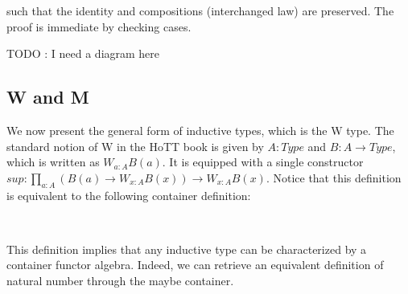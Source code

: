 {\begin{code}
%
\>[2]\AgdaSpace{}%
\AgdaSpace{}%
\AgdaSymbol{(}\AgdaSpace{}%
\AgdaOperator{\AgdaInductiveConstructor{,}}\AgdaSpace{}%
\AgdaSymbol{)}\AgdaSpace{}%
\AgdaSymbol{(}\AgdaSpace{}%
\AgdaOperator{\AgdaInductiveConstructor{,}}\AgdaSpace{}%
\AgdaSymbol{)}\AgdaSpace{}%
\AgdaSpace{}%
\AgdaSpace{}%
\AgdaSpace{}%
\AgdaSpace{}%
\AgdaOperator{\AgdaInductiveConstructor{,}}\AgdaSpace{}%
\AgdaSpace{}%
\AgdaSymbol{(}\AgdaSpace{}%
\AgdaSymbol{(}\AgdaSpace{}%
\AgdaSpace{}%
\AgdaSymbol{))}\AgdaSpace{}%
\AgdaSpace{}%
\AgdaSymbol{\}}\<%
\end{code}

such that the identity and compositions (interchanged law) are preserved. The proof is immediate by checking cases.

TODO : I need a diagram here

\subsection{W and M}

We now present the general form of inductive types, which is the W type. The standard notion of W in the HoTT book is given by $A : Type$ and $B : A \to Type$, which is written as $W_{a : A} B (a)$. It is equipped with a single constructor $sup : \prod_{a : A} (B (a) \to W_{x : A} B (x)) \to W_{x : A} B (x)$. Notice that this definition is equivalent to the following container definition:

\begin{code}%
\>[0]\AgdaSpace{}%
\AgdaSpace{}%
\AgdaSymbol{(}\AgdaSpace{}%
\AgdaSymbol{:}\AgdaSpace{}%
\AgdaSymbol{)}\AgdaSpace{}%
\AgdaSymbol{:}\AgdaSpace{}%
\AgdaSpace{}%
\<%
\\
\>[0][@{}l@{\AgdaIndent{0}}]%
\>[2]\AgdaSpace{}%
\AgdaSymbol{:}\AgdaSpace{}%
\AgdaSpace{}%
\AgdaSpace{}%
\AgdaSpace{}%
\AgdaSymbol{(}\AgdaSpace{}%
\AgdaSymbol{)}\AgdaSpace{}%
\AgdaSpace{}%
\AgdaSpace{}%
\<%
\end{code}

This definition implies that any inductive type can be characterized by a container functor algebra. Indeed, we can retrieve an equivalent definition of natural number through the maybe container.

}
